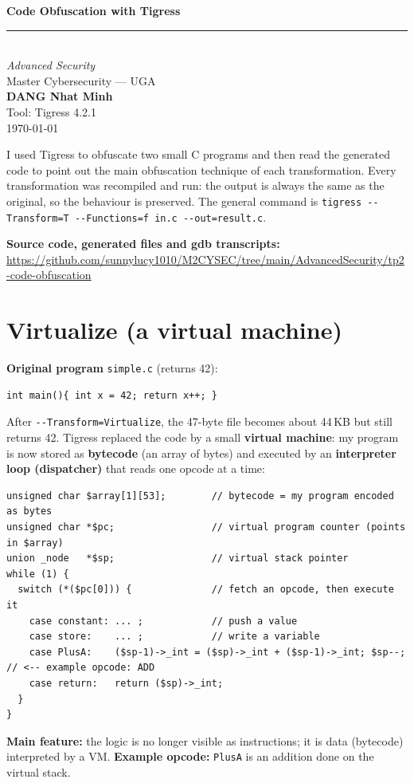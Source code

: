 \documentclass[11pt,a4paper]{article}
\newcommand{\code}[1]{\texttt{\small #1}}
\begin{document}
\thispagestyle{empty}
\vspace*{\fill}
\begin{center}
  {\Huge\bfseries Code Obfuscation with Tigress}\\[20pt]
  \rule{0.55\textwidth}{0.4pt}\\[16pt]
  {\large \textit{Advanced Security}}\\[4pt]
  {\normalsize Master Cybersecurity --- UGA}\\[28pt]
  {\Large \textbf{DANG Nhat Minh}}\\[10pt]
  {\small Tool: Tigress 4.2.1}\\[4pt]
  {\small \today}
\end{center}
\vspace*{\fill}
\newpage

I used Tigress to obfuscate two small C programs and then read the generated code to point out
the main obfuscation technique of each transformation. Every transformation was recompiled and run:
the output is always the same as the original, so the behaviour is preserved. The general command is
\code{tigress -{}-Transform=T -{}-Functions=f in.c -{}-out=result.c}.

\textbf{Source code, generated files and gdb transcripts:}\\
\url{https://github.com/sunnylucy1010/M2CYSEC/tree/main/AdvancedSecurity/tp2-code-obfuscation}

\section{Virtualize (a virtual machine)}
\textbf{Original program} \code{simple.c} (returns 42):
\begin{lstlisting}[style=base]
int main(){ int x = 42; return x++; }
\end{lstlisting}
After \code{-{}-Transform=Virtualize}, the 47-byte file becomes about 44\,KB but still returns 42.
Tigress replaced the code by a small \textbf{virtual machine}: my program is now stored as
\textbf{bytecode} (an array of bytes) and executed by an \textbf{interpreter loop (dispatcher)} that
reads one opcode at a time:
\begin{lstlisting}
unsigned char $array[1][53];        // bytecode = my program encoded as bytes
unsigned char *$pc;                 // virtual program counter (points in $array)
union _node   *$sp;                 // virtual stack pointer
while (1) {
  switch (*($pc[0])) {              // fetch an opcode, then execute it
    case constant: ... ;            // push a value
    case store:    ... ;            // write a variable
    case PlusA:    ($sp-1)->_int = ($sp)->_int + ($sp-1)->_int; $sp--;  // <-- example opcode: ADD
    case return:   return ($sp)->_int;
  }
}
\end{lstlisting}
\textbf{Main feature:} the logic is no longer visible as instructions; it is data (bytecode)
interpreted by a VM. \textbf{Example opcode:} \code{PlusA} is an addition done on the virtual stack.
\end{document}
